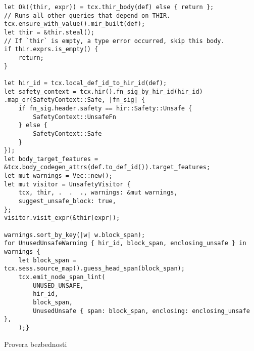 \begin{listing}[H]
\begin{verbatim}
let Ok((thir, expr)) = tcx.thir_body(def) else { return };
// Runs all other queries that depend on THIR.
tcx.ensure_with_value().mir_built(def);
let thir = &thir.steal();
// If `thir` is empty, a type error occurred, skip this body.
if thir.exprs.is_empty() {
    return;
}

let hir_id = tcx.local_def_id_to_hir_id(def);
let safety_context = tcx.hir().fn_sig_by_hir_id(hir_id)
.map_or(SafetyContext::Safe, |fn_sig| {
    if fn_sig.header.safety == hir::Safety::Unsafe {
        SafetyContext::UnsafeFn
    } else {
        SafetyContext::Safe
    }
});
let body_target_features = &tcx.body_codegen_attrs(def.to_def_id()).target_features;
let mut warnings = Vec::new();
let mut visitor = UnsafetyVisitor {
    tcx, thir, .  .  ., warnings: &mut warnings,
    suggest_unsafe_block: true,
};
visitor.visit_expr(&thir[expr]);

warnings.sort_by_key(|w| w.block_span);
for UnusedUnsafeWarning { hir_id, block_span, enclosing_unsafe } in warnings {
    let block_span = tcx.sess.source_map().guess_head_span(block_span);
    tcx.emit_node_span_lint(
        UNUSED_UNSAFE,
        hir_id,
        block_span,
        UnusedUnsafe { span: block_span, enclosing: enclosing_unsafe },
    );}
\end{verbatim}
\caption{Provera bezbednosti}
\label{lst:safety_check}
\end{listing}